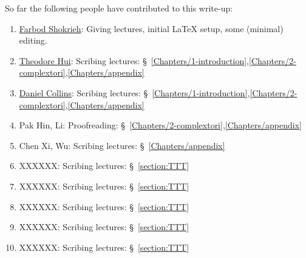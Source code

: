 



\vspace{+.5cm}

So far the following people have contributed to this write-up:
\begin{enumerate}
\item \href{http://www.math.cornell.edu/~farbod}{Farbod Shokrieh}: Giving lectures, initial LaTeX setup, some (minimal) editing.
\item \href{http://www.math.cornell.edu/m/People/bynetid/hh535}{Theodore Hui}: Scribing lectures: \S~\ref{Chapters/1-introduction},\ref{Chapters/2-complextori},\ref{Chapters/appendix}
\item \href{https://www.math.cornell.edu/m/People/bynetid/djc224}{Daniel Collins}: Scribing lectures: \S~\ref{Chapters/1-introduction},\ref{Chapters/2-complextori},\ref{Chapters/appendix}
\item Pak Hin, Li: Proofreading: \S~\ref{Chapters/2-complextori},\ref{Chapters/appendix}
\item Chen Xi, Wu: Scribing lectures: \S~\ref{Chapters/appendix}
\item XXXXXX: Scribing lectures: \S~\ref{section:TTT}
\item XXXXXX: Scribing lectures: \S~\ref{section:TTT}
\item XXXXXX: Scribing lectures: \S~\ref{section:TTT}
\item XXXXXX: Scribing lectures: \S~\ref{section:TTT}
\item XXXXXX: Scribing lectures: \S~\ref{section:TTT}
\end{enumerate}



